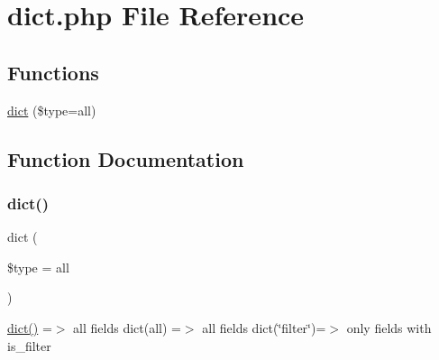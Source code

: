 \hypertarget{dict_8php}{}\section{dict.\+php File Reference}
\label{dict_8php}
\subsection*{Functions}
\begin{DoxyCompactItemize}
\item 
\hyperlink{dict_8php_a06bc942ddeb3d0d20410b67298781449}{dict} (\$type=\textquotesingle{}all\textquotesingle{})
\end{DoxyCompactItemize}


\subsection{Function Documentation}
\hypertarget{dict_8php_a06bc942ddeb3d0d20410b67298781449}{}\label{dict_8php_a06bc942ddeb3d0d20410b67298781449} 
\subsubsection{\texorpdfstring{dict()}{dict()}}
{\footnotesize\ttfamily dict (\begin{DoxyParamCaption}\item[{}]{\$type = {\ttfamily \textquotesingle{}all\textquotesingle{}} }\end{DoxyParamCaption})}

\hyperlink{dict_8php_a06bc942ddeb3d0d20410b67298781449}{dict()} =$>$ all fields dict(\textquotesingle{}all\textquotesingle{}) =$>$ all fields dict(\char`\"{}filter\char`\"{})=$>$ only fields with is\+\_\+filter 